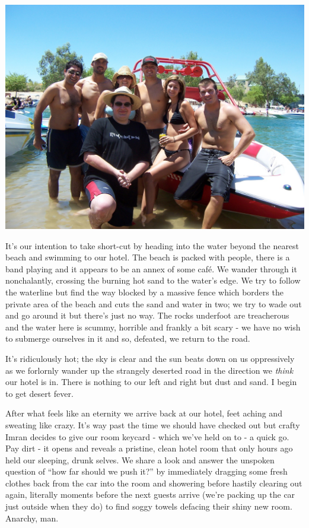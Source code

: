 \documentclass[a5paper,titlepage,11pt]{book}
\begin{document}
\begin{center}\includegraphics[width=\textwidth]{gfx/100_1604}\end{center}

It's our intention to take short-cut by heading into the water beyond the nearest beach and swimming to our hotel.  The beach is packed with people, there is a band playing and it appears to be an annex of some caf\'{e}.  We wander through it nonchalantly, crossing the burning hot sand to the water's edge.  We try to follow the waterline but find the way blocked by a massive fence which borders the private area of the beach and cuts the sand and water in two; we try to wade out and go around it but there's just no way.  The rocks underfoot are treacherous and the water here is scummy, horrible and frankly a bit scary - we have no wish to submerge ourselves in it and so, defeated, we return to the road.

It's ridiculously hot; the sky is clear and the sun beats down on us oppressively as we forlornly wander up the strangely deserted road in the direction we \emph{think} our hotel is in.  There is nothing to our left and right but dust and sand.  I begin to get desert fever.

After what feels like an eternity we arrive back at our hotel, feet aching and sweating like crazy.  It's way past the time we should have checked out but crafty Imran decides to give our room keycard - which we've held on to - a quick go.  Pay dirt - it opens and reveals a pristine, clean hotel room that only hours ago held our sleeping, drunk selves.  We share a look and answer the unspoken question of ``how far should we push it?'' by immediately dragging some fresh clothes back from the car into the room and showering before hastily clearing out again, literally moments before the next guests arrive (we're packing up the car just outside when they do) to find soggy towels defacing their shiny new room.  Anarchy, man.
\end{document}
